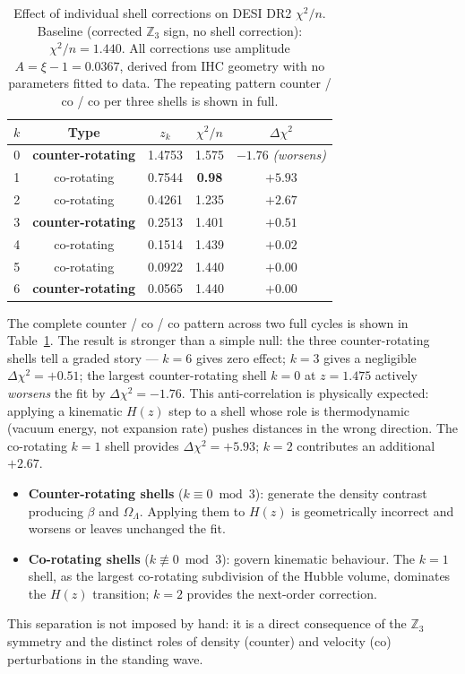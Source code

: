 \documentclass[12pt,a4paper]{article}
\begin{document}
\begin{table}[htbp]
\centering
\caption{Effect of individual shell corrections on DESI DR2 $\chi^2/n$.
Baseline (corrected $\mathbb{Z}_3$ sign, no shell correction): $\chi^2/n = 1.440$.
All corrections use amplitude $A = \xi-1 = 0.0367$, derived from IHC geometry with no parameters fitted to data.
The repeating pattern counter / co / co per three shells is shown in full.}
\label{tab:shells}
\begin{tabular}{ccccc}
\toprule
$k$ & Type & $z_k$ & $\chi^2/n$ & $\Delta\chi^2$ \\
\midrule
0 & \textbf{counter-rotating} & 1.4753 & 1.575 & $-1.76$ \textit{(worsens)} \\
1 & co-rotating & 0.7544 & \textbf{0.98} & $+5.93$ \\
2 & co-rotating & 0.4261 & 1.235 & $+2.67$ \\
\midrule
3 & \textbf{counter-rotating} & 0.2513 & 1.401 & $+0.51$ \\
4 & co-rotating & 0.1514 & 1.439 & $+0.02$ \\
5 & co-rotating & 0.0922 & 1.440 & $+0.00$ \\
\midrule
6 & \textbf{counter-rotating} & 0.0565 & 1.440 & $+0.00$ \\
\bottomrule
\end{tabular}
\end{table}

The complete counter / co / co pattern across two full cycles is shown in
Table~\ref{tab:shells}. The result is stronger than a simple null: the three
counter-rotating shells tell a graded story --- $k=6$ gives zero
effect; $k=3$ gives a negligible $\Delta\chi^2 = +0.51$; the largest
counter-rotating shell $k=0$ at $z = 1.475$ actively \emph{worsens} the fit
by $\Delta\chi^2 = -1.76$. This anti-correlation is physically expected: applying
a kinematic $H(z)$ step to a shell whose role is thermodynamic (vacuum energy,
not expansion rate) pushes distances in the wrong direction. The co-rotating $k=1$
shell provides $\Delta\chi^2 = +5.93$; $k=2$ contributes an additional $+2.67$.
\begin{itemize}
  \item \textbf{Counter-rotating shells} ($k \equiv 0 \bmod 3$): generate the
        density contrast producing $\beta$ and $\Omega_\Lambda$. Applying them
        to $H(z)$ is geometrically incorrect and worsens or leaves unchanged the fit.
  \item \textbf{Co-rotating shells} ($k \not\equiv 0 \bmod 3$): govern kinematic
        behaviour. The $k=1$ shell, as the largest co-rotating subdivision of the
        Hubble volume, dominates the $H(z)$ transition; $k=2$ provides the
        next-order correction.
\end{itemize}
This separation is not imposed by hand: it is a direct consequence of the
$\mathbb{Z}_3$ symmetry and the distinct roles of density (counter) and velocity
(co) perturbations in the standing wave.
\end{document}
